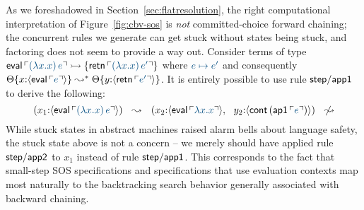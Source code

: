 As we foreshadowed in Section~\ref{sec:flatresolution}, the right
computational interpretation of Figure~\ref{fig:cbv-sos} is {\it not}
committed-choice forward chaining; the concurrent rules we generate
can get stuck without states being stuck, and factoring does not seem
to provide a way out. Consider terms of type ${\sf
  eval}\,\interp{(\lambda x.x)\,e} \lefti \{ {\sf
  retn}\,\interp{(\lambda x.x)\,e'} \}$ where $\obj{e \mapsto e'}$ and
consequently $\tackon{\Theta}{x{:}\susp{{\sf eval}\,\interp{e}}}
\leadsto^* \tackon{\Theta}{y{:}\susp{{\sf retn}\,\interp{e'}}}$.  It
is entirely possible to use rule ${\sf step/app1}$ to derive the
following:
\[
  (x_1{:}\susp{{\sf eval}\,\interp{(\lambda x.x)\,e}})
   ~~ \leadsto ~~
  (x_2{:}\susp{{\sf eval}\,\interp{\lambda x.x}}, ~~
  y_2{:}\susp{{\sf cont}\,({\sf ap1}\,\interp{e})})
   ~~ \not\leadsto
\]
While stuck states in abstract machines raised alarm bells about
language safety, the stuck state above is not a concern -- we merely
should have applied rule ${\sf step/app2}$ to $x_1$ instead
of rule ${\sf step/app1}$. This
corresponds to the fact that small-step SOS specifications and
specifications that use evaluation contexts 
map most naturally to the backtracking
search behavior generally associated with backward chaining. 



